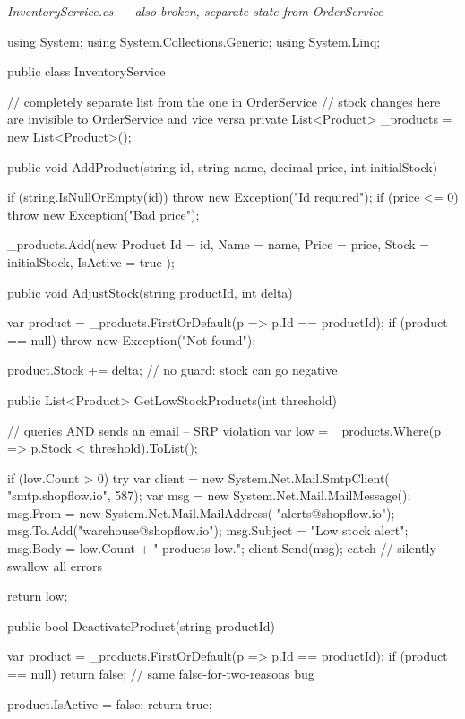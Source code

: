 \documentclass[11pt,a4paper]{article}
\newcommand{\codelabel}[1]{%
  \vspace{2pt}%
  {\footnotesize\color{gray}\textit{#1}}%
  \vspace{2pt}%
}
\begin{document}
\codelabel{InventoryService.cs --- also broken, separate state from OrderService}
\begin{codeframe}
\begin{codeblock}
using System;
using System.Collections.Generic;
using System.Linq;

public class InventoryService
{
    // completely separate list from the one in OrderService
    // stock changes here are invisible to OrderService and vice versa
    private List<Product> _products = new List<Product>();

    public void AddProduct(string id, string name,
                           decimal price, int initialStock)
    {
        if (string.IsNullOrEmpty(id))
            throw new Exception("Id required");
        if (price <= 0)
            throw new Exception("Bad price");

        _products.Add(new Product
        {
            Id       = id,
            Name     = name,
            Price    = price,
            Stock    = initialStock,
            IsActive = true
        });
    }

    public void AdjustStock(string productId, int delta)
    {
        var product = _products.FirstOrDefault(p => p.Id == productId);
        if (product == null)
            throw new Exception("Not found");

        product.Stock += delta;  // no guard: stock can go negative
    }

    public List<Product> GetLowStockProducts(int threshold)
    {
        // queries AND sends an email -- SRP violation
        var low = _products.Where(p => p.Stock < threshold).ToList();

        if (low.Count > 0)
        {
            try
            {
                var client = new System.Net.Mail.SmtpClient(
                    "smtp.shopflow.io", 587);
                var msg    = new System.Net.Mail.MailMessage();
                msg.From   = new System.Net.Mail.MailAddress(
                    "alerts@shopflow.io");
                msg.To.Add("warehouse@shopflow.io");
                msg.Subject = "Low stock alert";
                msg.Body    = low.Count + " products low.";
                client.Send(msg);
            }
            catch { }  // silently swallow all errors
        }

        return low;
    }

    public bool DeactivateProduct(string productId)
    {
        var product = _products.FirstOrDefault(p => p.Id == productId);
        if (product == null) return false;  // same false-for-two-reasons bug

        product.IsActive = false;
        return true;
    }
}
\end{codeblock}
\end{codeframe}
\end{document}
